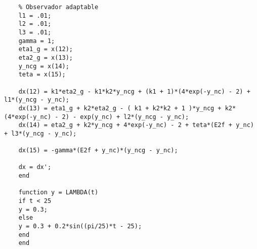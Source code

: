\begin{verbatim}
	% Observador adaptable
	l1 = .01;
	l2 = .01;
	l3 = .01;
	gamma = 1;
	eta1_g = x(12);
	eta2_g = x(13);
	y_ncg = x(14);
	teta = x(15);
	
	dx(12) = k1*eta2_g - k1*k2*y_ncg + (k1 + 1)*(4*exp(-y_nc) - 2) + l1*(y_ncg - y_nc);
	dx(13) = eta1_g + k2*eta2_g - ( k1 + k2*k2 + 1 )*y_ncg + k2*(4*exp(-y_nc) - 2) - exp(y_nc) + l2*(y_ncg - y_nc);
	dx(14) = eta2_g + k2*y_ncg + 4*exp(-y_nc) - 2 + teta*(E2f + y_nc) + l3*(y_ncg - y_nc);
	
	dx(15) = -gamma*(E2f + y_nc)*(y_ncg - y_nc);
	
	dx = dx';
	end
	
	function y = LAMBDA(t)
	if t < 25
	y = 0.3;
	else
	y = 0.3 + 0.2*sin((pi/25)*t - 25);
	end
	end
	\end{verbatim}
	